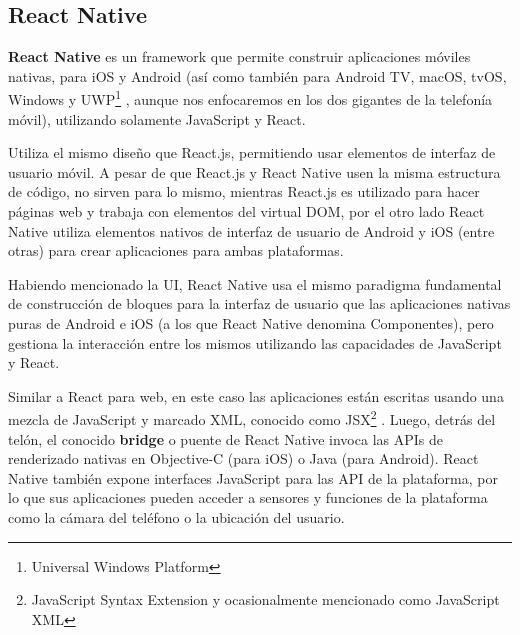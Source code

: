 \subsection{React Native}\label{chapter:introduction}






\textbf{React Native} es un framework que permite construir aplicaciones móviles nativas, para iOS y Android (así como también para Android TV, macOS, tvOS, Windows y UWP\footnote{Universal Windows Platform}  , aunque nos enfocaremos en los dos gigantes de la telefonía móvil), utilizando solamente JavaScript y React.

Utiliza el mismo diseño que React.js, permitiendo usar elementos de interfaz de usuario móvil. A pesar de que React.js y React Native usen la misma estructura de código, no sirven para lo mismo, mientras React.js es utilizado para hacer páginas web y trabaja con elementos del virtual DOM, por el otro lado React Native utiliza elementos nativos de interfaz de usuario de Android y iOS (entre otras) para crear aplicaciones para ambas plataformas.

Habiendo mencionado la UI, React Native usa el mismo paradigma fundamental de construcción de bloques para la interfaz de usuario que las aplicaciones nativas puras de Android e iOS (a los que React Native denomina Componentes), pero gestiona la interacción entre los mismos utilizando las capacidades de JavaScript y React.

Similar a React para web, en este caso las aplicaciones están escritas usando una mezcla de JavaScript y marcado XML, conocido como JSX\footnote{JavaScript Syntax Extension y ocasionalmente mencionado como JavaScript XML} . Luego, detrás del telón, el conocido \textbf{bridge} o puente de React Native invoca las APIs de renderizado nativas en Objective-C (para iOS) o Java (para Android). React Native también expone interfaces JavaScript para las API de la plataforma, por lo que sus aplicaciones pueden acceder a sensores y funciones de la plataforma como la cámara del teléfono o la ubicación del usuario.

